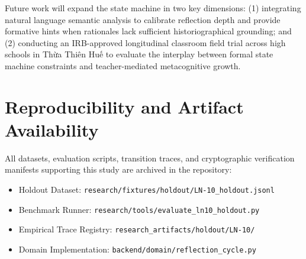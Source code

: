 \documentclass[11pt,a4paper]{article}
\begin{document}
Future work will expand the state machine in two key dimensions: (1) integrating natural language semantic analysis to calibrate reflection depth and provide formative hints when rationales lack sufficient historiographical grounding; and (2) conducting an IRB-approved longitudinal classroom field trial across high schools in Thừa Thiên Huế to evaluate the interplay between formal state machine constraints and teacher-mediated metacognitive growth.

\section*{Reproducibility and Artifact Availability}
All datasets, evaluation scripts, transition traces, and cryptographic verification manifests supporting this study are archived in the repository:
\begin{itemize}
    \item Holdout Dataset: \texttt{research/fixtures/holdout/LN-10\_holdout.jsonl}
    \item Benchmark Runner: \texttt{research/tools/evaluate\_ln10\_holdout.py}
    \item Empirical Trace Registry: \texttt{research\_artifacts/holdout/LN-10/}
    \item Domain Implementation: \texttt{backend/domain/reflection\_cycle.py}
\end{itemize}
\end{document}
